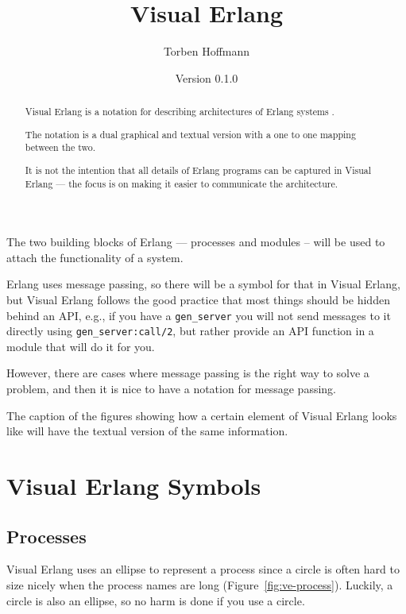 \documentclass[a4paper, pdftex]{tufte-handout}
\title{Visual Erlang}
\author{Torben Hoffmann}%
\date{Version 0.1.0}
\begin{document}
\maketitle


\begin{abstract}
  Visual Erlang is a notation for describing architectures of Erlang systems
  .

  The notation is a dual graphical and textual version with a one to one mapping
  between the two.

  It is not the intention that all details of Erlang programs can be captured in
  Visual Erlang --- the focus is on making it easier to communicate the architecture.
\end{abstract}



The two building blocks of Erlang --- processes and modules -- will be used to attach
the functionality of a system.

Erlang uses message passing, so there will be a symbol for that in Visual Erlang, but
Visual Erlang follows the good practice that most things should be hidden behind an
API, e.g., if you have a \verb|gen_server| you will not send messages to it directly
using \verb|gen_server:call/2|, but rather provide an API function in a module that
will do it for you.

However, there are cases where message passing is the right way to solve a problem,
and then it is nice to have a notation for message passing.

The caption of the figures showing how a certain element of Visual Erlang looks like
will have the textual version of the same information. 

\section{Visual Erlang Symbols}
\label{sec:visu-erlang-symb}

\subsection{Processes}
\label{sec:processes}

Visual Erlang uses an ellipse to represent a process since a circle is often hard to
size nicely when the process names are long (Figure~\ref{fig:ve-process}). Luckily, a
circle is also an ellipse, so no harm is done if you use a circle.
\end{document}
